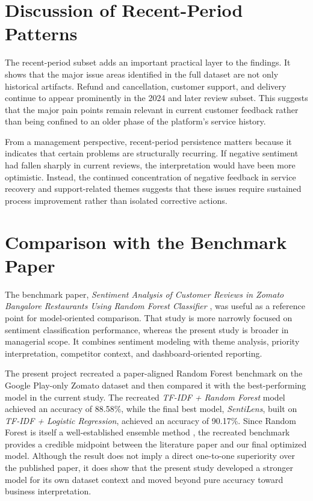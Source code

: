 \section{Discussion of Recent-Period Patterns}

The recent-period subset adds an important practical layer to the findings. It shows that the major issue areas identified in the full dataset are not only historical artifacts. Refund and cancellation, customer support, and delivery continue to appear prominently in the 2024 and later review subset. This suggests that the major pain points remain relevant in current customer feedback rather than being confined to an older phase of the platform's service history.

From a management perspective, recent-period persistence matters because it indicates that certain problems are structurally recurring. If negative sentiment had fallen sharply in current reviews, the interpretation would have been more optimistic. Instead, the continued concentration of negative feedback in service recovery and support-related themes suggests that these issues require sustained process improvement rather than isolated corrective actions.

\section{Comparison with the Benchmark Paper}

The benchmark paper, \textit{Sentiment Analysis of Customer Reviews in Zomato Bangalore Restaurants Using Random Forest Classifier} \cite{jonathan2019}, was useful as a reference point for model-oriented comparison. That study is more narrowly focused on sentiment classification performance, whereas the present study is broader in managerial scope. It combines sentiment modeling with theme analysis, priority interpretation, competitor context, and dashboard-oriented reporting.

The present project recreated a paper-aligned Random Forest benchmark on the Google Play-only Zomato dataset and then compared it with the best-performing model in the current study. The recreated \textit{TF-IDF + Random Forest} model achieved an accuracy of 88.58\%, while the final best model, \textit{SentiLens}, built on \textit{TF-IDF + Logistic Regression}, achieved an accuracy of 90.17\%. Since Random Forest is itself a well-established ensemble method \cite{breiman2001}, the recreated benchmark provides a credible midpoint between the literature paper and our final optimized model. Although the result does not imply a direct one-to-one superiority over the published paper, it does show that the present study developed a stronger model for its own dataset context and moved beyond pure accuracy toward business interpretation.

